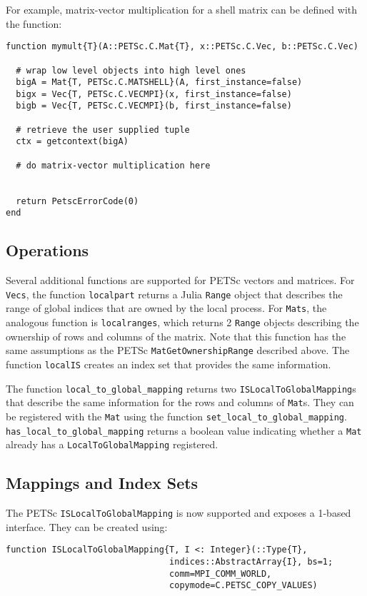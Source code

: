 \documentclass{article}
\begin{document}
For example, 
matrix-vector multiplication for a shell matrix can be defined with the 
function:


\begin{verbatim}
function mymult{T}(A::PETSc.C.Mat{T}, x::PETSc.C.Vec, b::PETSc.C.Vec)

  # wrap low level objects into high level ones
  bigA = Mat{T, PETSc.C.MATSHELL}(A, first_instance=false)
  bigx = Vec{T, PETSc.C.VECMPI}(x, first_instance=false)
  bigb = Vec{T, PETSc.C.VECMPI}(b, first_instance=false)

  # retrieve the user supplied tuple
  ctx = getcontext(bigA)

  # do matrix-vector multiplication here
  

  return PetscErrorCode(0)
end
\end{verbatim}


\subsection{Operations}
Several additional functions are supported for PETSc vectors and matrices.
For \texttt{Vecs}, the function \texttt{localpart} returns a Julia \texttt{Range} object that describes the range of global indices that are owned by the 
local process.
For \texttt{Mats}, the analogous function is \texttt{localranges}, which 
returns 2 \texttt{Range} objects describing the ownership of rows and columns
of the matrix.  Note that this function has the same assumptions as the PETSc
\texttt{MatGetOwnershipRange} described above.
The function \texttt{localIS} creates an index set that provides the same 
information.

The function \texttt{local\_to\_global\_mapping} returns two 
\texttt{ISLocalToGlobalMapping}s that describe the same information for 
the rows and columns of \texttt{Mat}s.  They can be registered with the
\texttt{Mat} using the function \texttt{set\_local\_to\_global\_mapping}.
\texttt{has\_local\_to\_global\_mapping} returns a boolean value indicating
whether a \texttt{Mat} already has a \texttt{LocalToGlobalMapping} registered.

\subsection{Mappings and Index Sets} \label{sec:is}
The PETSc \texttt{ISLocalToGlobalMapping} is now supported and exposes a 
1-based interface.
They can be created using:

\begin{verbatim}
function ISLocalToGlobalMapping{T, I <: Integer}(::Type{T}, 
                                indices::AbstractArray{I}, bs=1; 
                                comm=MPI_COMM_WORLD, 
                                copymode=C.PETSC_COPY_VALUES)
\end{verbatim}
\end{document}

